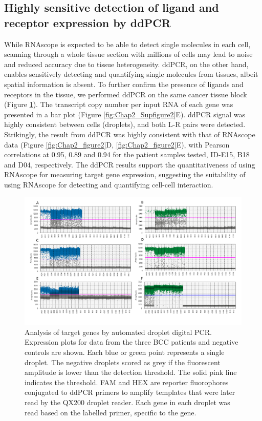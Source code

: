 \subsection{Highly sensitive detection of ligand and receptor expression by ddPCR}
While RNAscope is expected to be able to detect single molecules in each cell, scanning through a whole tissue section with millions of cells may lead to noise and reduced accuracy due to tissue heterogeneity. ddPCR, on the other hand, enables sensitively detecting and quantifying single molecules from tissues, albeit spatial information is absent. To further confirm the presence of ligands and receptors in the tissue, we performed ddPCR on the same cancer tissue block (Figure  \ref{fig:Chap2_Supfigure6}). The transcript copy number per input RNA of each gene was presented in a bar plot (Figure \ref{fig:Chap2_Supfigure2}E). ddPCR signal was highly consistent between cells (droplets), and both L-R pairs were detected. Strikingly, the result from ddPCR was highly consistent with that of RNAscope data (Figure \ref{fig:Chap2_figure2}D, \ref{fig:Chap2_figure2}E), with Pearson correlations at 0.95, 0.89 and 0.94 for the patient samples tested, ID-E15, B18 and D04, respectively. The ddPCR results support the quantitativeness of using RNAscope for measuring target gene expression, suggesting the suitability of using RNAscope for detecting and quantifying cell-cell interaction. 

\begin{figure}[htp]
\renewcommand{\figurename}{Figure}
    \centering
    \includegraphics[width=0.75\columnwidth]{Chapter2/Figures/Supplemental_Fig_S6.png}
    \caption[Analysis of target genes by automated droplet digital PCR.]{Analysis of target genes by automated droplet digital PCR. Expression plots for data from the three BCC patients and negative controls are shown. Each blue or green point represents a single droplet. The negative droplets scored as grey if the fluorescent amplitude is lower than the detection threshold. The solid pink line indicates the threshold. FAM and HEX are reporter fluorophores conjugated to ddPCR primers to amplify templates that were later read by the QX200 droplet reader. Each gene in each droplet was read based on the labelled primer, specific to the gene.}
    \label{fig:Chap2_Supfigure6}
\end{figure}


